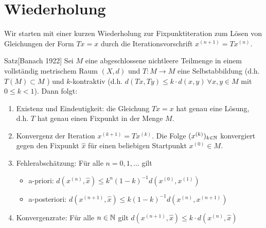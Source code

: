 \section{Wiederholung}

Wir starten mit einer kurzen Wiederholung zur Fixpunktiteration zum Lösen von Gleichungen 
der Form $Tx=x$ durch die Iterationsvorschrift $x^{(n+1)}=Tx^{(n)}$.

\begin{colbox}{Satz}[Banach 1922]
  Sei $M$ eine abgeschlossene nichtleere Teilmenge in einem vollständig metrischem Raum $(X,d)$ 
  und $T:M\rightarrow M$ eine Selbstabbildung (d.h. $T(M)\subset M$ ) und $k$-kontraktiv (d.h. 
  $d(Tx,Ty)\leq k\cdot d(x,y)\ \forall x,y\in M$ 
  mit $0\leq k < 1$). Dann folgt:
  \begin{enumerate}
    \item Existenz und Eindeutigkeit: die Gleichung $Tx=x$ hat genau eine Lösung, d.h. $T$ hat genau einen 
    Fixpunkt in der Menge $M$.
    \item Konvergenz der Iteration $x^{(k+1)}=Tx^{(k)}$. Die Folge $(x^{(k)})_{k\in\mathbb N}$ konvergiert gegen den 
    Fixpunkt $\hat{x}$ für einen beliebigen Startpunkt $x^{(0)}\in M$.
    \item Fehlerabschätzung: Für alle $n=0,1,\dotsc$ gilt 
    \begin{itemize}
      \item a-priori: $d(x^{(n)},\hat{x})\leq k^n(1-k)^{-1}d(x^{(0)},x^{(1)})$
      \item a-posteriori: $d(x^{(n+1)},\hat{x})\leq k(1-k)^{-1}d(x^{(n)},x^{(n+1)})$
    \end{itemize}
    \item Konvergenzrate: Für alle $n\in\mathbb N$ gilt $d(x^{(n+1)},\hat{x})\leq k\cdot d(x^{(n)},\hat{x})$
  \end{enumerate}
\end{colbox}

